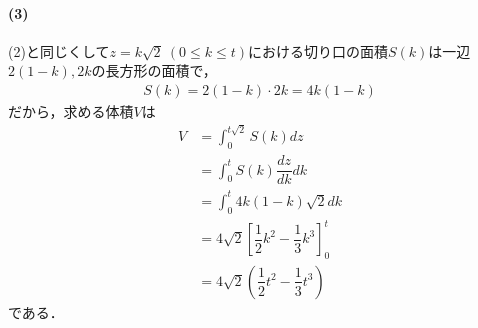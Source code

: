 \documentclass[../../main.tex]{subfiles}
\begin{document}
\paragraph{(3)}

(2)と同じくして$z=k\sqrt{2} \ (0 \le k \le t)$における切り口の面積$S(k)$は一辺$2(1-k),2k$の長方形の面積で，
\begin{align}
  S(k) = 2(1-k) \cdot 2k = 4k(1-k)
\end{align}
だから，求める体積$V$は
\begin{align}
  V &= \int_0^{t\sqrt{2}} S(k) dz \\
  &= \int_0^t S(k) \dfrac{dz}{dk} dk \\
  &= \int_0^t 4k(1-k) \sqrt{2} dk \\
  &= 4\sqrt{2} \left[ \dfrac{1}{2}k^2 - \dfrac{1}{3}k^3 \right]_0^t \\
  &= 4\sqrt{2} \left( \dfrac{1}{2}t^2 - \dfrac{1}{3}t^3 \right)
\end{align}
である．
\end{document}
